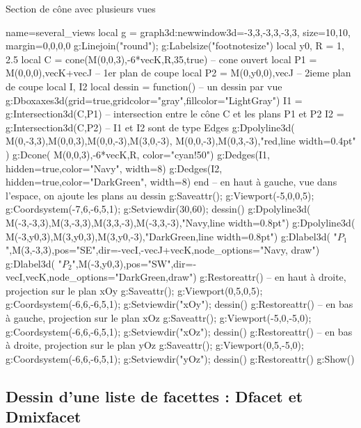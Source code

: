 \begin{demo}{Section de cône avec plusieurs vues}
\begin{luadraw}{name=several_views}
local g = graph3d:new{window3d={-3,3,-3,3,-3,3}, size={10,10}, margin={0,0,0,0}}
g:Linejoin("round"); g:Labelsize("footnotesize")
local y0, R = 1, 2.5
local C = cone(M(0,0,3),-6*vecK,R,35,true) -- cone ouvert
local P1 = {M(0,0,0),vecK+vecJ} -- 1er plan de coupe
local P2 = {M(0,y0,0),vecJ} -- 2ieme plan de coupe
local I, I2 
local dessin = function() -- un dessin par vue
    g:Dboxaxes3d({grid=true,gridcolor="gray",fillcolor="LightGray"})
    I1 = g:Intersection3d(C,P1) -- intersection entre le cône C et les plans P1 et P2
    I2 = g:Intersection3d(C,P2) -- I1 et I2 sont de type Edges
    g:Dpolyline3d( {{M(0,-3,3),M(0,0,3),M(0,0,-3),M(3,0,-3)}, {M(0,0,-3),M(0,3,-3)}},"red,line width=0.4pt" )
    g:Dcone( M(0,0,3),-6*vecK,R, {color="cyan!50"})
    g:Dedges(I1, {hidden=true,color="Navy", width=8})
    g:Dedges(I2, {hidden=true,color="DarkGreen", width=8})
end
-- en haut à gauche, vue dans l'espace, on ajoute les plans au dessin
g:Saveattr(); g:Viewport(-5,0,0,5); g:Coordsystem(-7,6,-6,5,1); g:Setviewdir(30,60); dessin()
g:Dpolyline3d( {M(-3,-3,3),M(3,-3,3),M(3,3,-3),M(-3,3,-3)},"Navy,line width=0.8pt")
g:Dpolyline3d( {M(-3,y0,3),M(3,y0,3),M(3,y0,-3)},"DarkGreen,line width=0.8pt")
g:Dlabel3d( "$P_1$",M(3,-3,3),{pos="SE",dir={-vecI,-vecJ+vecK},node_options="Navy, draw"})
g:Dlabel3d( "$P_2$",M(-3,y0,3),{pos="SW",dir={-vecI,vecK},node_options="DarkGreen,draw"})
g:Restoreattr()
-- en haut à droite, projection sur le plan xOy
g:Saveattr(); g:Viewport(0,5,0,5); g:Coordsystem(-6,6,-6,5,1); g:Setviewdir("xOy"); dessin()
g:Restoreattr()
-- en bas à gauche, projection sur le plan xOz
g:Saveattr(); g:Viewport(-5,0,-5,0); g:Coordsystem(-6,6,-6,5,1); g:Setviewdir("xOz"); dessin()
g:Restoreattr()
-- en bas à droite, projection sur le plan yOz
g:Saveattr(); g:Viewport(0,5,-5,0); g:Coordsystem(-6,6,-6,5,1); g:Setviewdir("yOz"); dessin()
g:Restoreattr()
g:Show()
\end{luadraw}
\end{demo}

\subsection{Dessin d'une liste de facettes : Dfacet et Dmixfacet}

